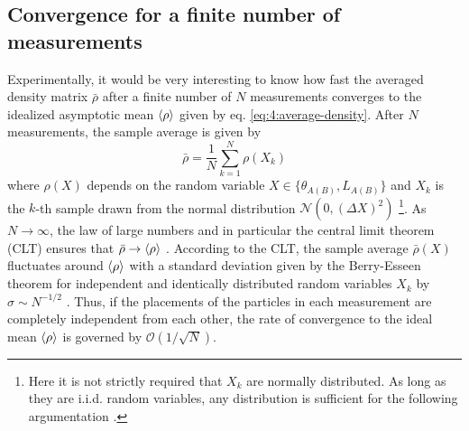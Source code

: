 \subsection*{Convergence for a finite number of measurements}
Experimentally, it would be very interesting to know how fast the averaged density matrix $\bar{\rho}$ after a finite number of $N$ measurements converges to the idealized asymptotic mean $\left\langle\rho\right\rangle$ given by eq. \eqref{eq:4:average-density}.
After $N$ measurements, the sample average is given by
\begin{equation}
  \bar{\rho} = \frac{1}{N} \sum_{k=1}^{N} \rho(X_k)
\end{equation}
where $\rho(X)$ depends on the random variable $X \in \{\theta_{A(B)}, L_{A(B)}\}$ and $X_k$ is the $k$-th sample drawn from the normal distribution $\mathcal{N}(0, (\Delta X)^2)$ \footnote{Here it is not strictly required that $X_k$ are normally distributed. As long as they are i.i.d. random variables, any distribution is sufficient for the following argumentation \cite[p. 1195]{Riley_2018}.}.
As $N \rightarrow \infty$, the law of large numbers and in particular the central limit theorem (CLT) ensures that $\bar{\rho} \rightarrow \left\langle\rho\right\rangle$ \cite[p. 1195]{Riley_2018}.
According to the CLT, the sample average $\bar{\rho}(X)$ fluctuates around $\left\langle\rho\right\rangle$ with a standard deviation given by the Berry-Esseen theorem for independent and identically distributed random variables $X_k$ by $\sigma \sim N^{-1/2}$ \cite{Berry_1941}.
Thus, if the placements of the particles in each measurement are completely independent from each other, the rate of convergence to the ideal mean $\left\langle\rho\right\rangle$ is governed by $\mathcal{O}(1/\sqrt{N})$.

